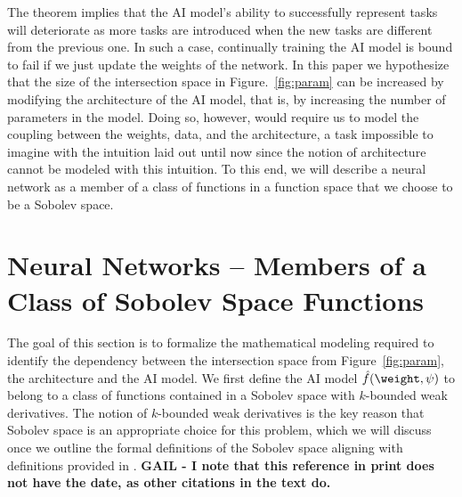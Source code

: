 The theorem implies that the AI model's ability to successfully represent tasks will deteriorate as more tasks are introduced when the new tasks are different from the previous one. In such a case, continually training the AI model is bound to fail if we just update the weights of the network. In this paper we hypothesize that the size of the intersection space in Figure.~\ref{fig:param} can be increased by modifying the architecture of the AI model, that is, by increasing the number of parameters in the model. Doing so, however,  would require us to model the coupling between the weights, data, and the architecture, a task impossible to imagine with the intuition laid out until now since the notion of architecture cannot be modeled with this intuition. To this end, we will describe a neural network as a member of a class of functions in a function space that we choose to be a Sobolev space.


\section{Neural Networks --  Members of a Class of Sobolev Space Functions}
The goal of this section is to formalize the mathematical modeling required to identify the dependency between the intersection space from Figure~\ref{fig:param}, the architecture and the AI model. We first define the AI model $\hat{f}(\weight, \psi)$ to belong to a class of functions contained in a Sobolev space with $k$-bounded weak derivatives. The notion of $k$-bounded weak derivatives is the key reason that Sobolev space is an appropriate choice for this problem, which we will discuss once we outline the formal definitions of the Sobolev space aligning with definitions provided in \cite{mahanNonclosednessSetsNeural2021a}.
\textbf{GAIL - I note that this reference in print does not have the date, as other citations in the text do.}

